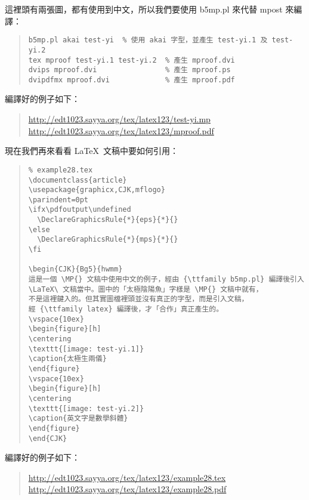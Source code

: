 這裡頭有兩張圖，都有使用到中文，所以我們要使用 {\ttfamily b5mp.pl} 來代替 {\ttfamily mpost} 來編譯：

\begin{quote}
  \begin{verbatim}
b5mp.pl akai test-yi  % 使用 akai 字型，並產生 test-yi.1 及 test-yi.2
tex mproof test-yi.1 test-yi.2  % 產生 mproof.dvi
dvips mproof.dvi                % 產生 mproof.ps
dvipdfmx mproof.dvi             % 產生 mproof.pdf
\end{verbatim}
\end{quote}

編譯好的例子如下：

\begin{quote}
  \url{http://edt1023.sayya.org/tex/latex123/test-yi.mp}\\
  \url{http://edt1023.sayya.org/tex/latex123/mproof.pdf}
\end{quote}

現在我們再來看看 \LaTeX\ 文稿中要如何引用：

\begin{quote}
  \begin{verbatim}
% example28.tex
\documentclass{article}
\usepackage{graphicx,CJK,mflogo}
\parindent=0pt
\ifx\pdfoutput\undefined
  \DeclareGraphicsRule{*}{eps}{*}{}
\else
  \DeclareGraphicsRule{*}{mps}{*}{}
\fi

\begin{CJK}{Bg5}{hwmm}
這是一個 \MP{} 文稿中使用中文的例子，經由 {\ttfamily b5mp.pl} 編譯後引入
\LaTeX\ 文稿當中。圖中的「太極陰陽魚」字樣是 \MP{} 文稿中就有，
不是這裡鍵入的。但其實圖檔裡頭並沒有真正的字型，而是引入文稿，
經 {\ttfamily latex} 編譯後，才「合作」真正產生的。
\vspace{10ex}
\begin{figure}[h]
\centering
\texttt{[image: test-yi.1]}
\caption{太極生兩儀}
\end{figure}
\vspace{10ex}
\begin{figure}[h]
\centering
\texttt{[image: test-yi.2]}
\caption{英文字是數學斜體}
\end{figure}
\end{CJK}

\end{verbatim}
\end{quote}

編譯好的例子如下：

\begin{quote}
  \url{http://edt1023.sayya.org/tex/latex123/example28.tex} \\
  \url{http://edt1023.sayya.org/tex/latex123/example28.pdf}
\end{quote}

